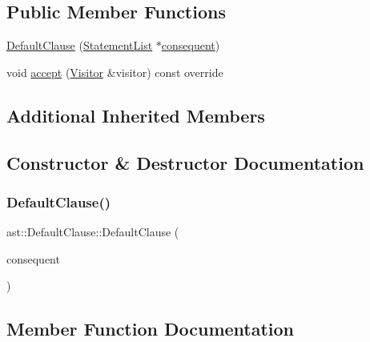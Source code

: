 \subsection*{Public Member Functions}
\begin{DoxyCompactItemize}
\item 
\hyperlink{structast_1_1_default_clause_ae2ed04ca435788a9688223373d14a4d7}{Default\+Clause} (\hyperlink{structast_1_1_statement_list}{Statement\+List} $\ast$\hyperlink{structast_1_1_case_clause_ad858f522c59ec1fe025067c1799df288}{consequent})
\item 
void \hyperlink{structast_1_1_default_clause_a9a96288d67e4e058c860d094f6a5e3a8}{accept} (\hyperlink{structast_1_1_visitor}{Visitor} \&visitor) const override
\end{DoxyCompactItemize}
\subsection*{Additional Inherited Members}


\subsection{Constructor \& Destructor Documentation}
\mbox{\label{structast_1_1_default_clause_ae2ed04ca435788a9688223373d14a4d7}} 
\subsubsection{\texorpdfstring{Default\+Clause()}{DefaultClause()}}
{\footnotesize\ttfamily ast\+::\+Default\+Clause\+::\+Default\+Clause (\begin{DoxyParamCaption}\item[{\hyperlink{structast_1_1_statement_list}{Statement\+List} $\ast$}]{consequent }\end{DoxyParamCaption})\hspace{0.3cm}{\ttfamily [inline]}}



\subsection{Member Function Documentation}
\mbox{\label{structast_1_1_default_clause_a9a96288d67e4e058c860d094f6a5e3a8}} 

